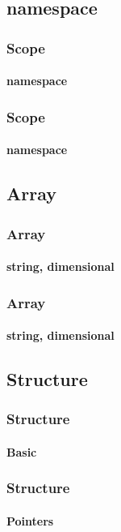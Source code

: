 \documentclass[hyperref={pdfpagelabels=true}]{beamer}
\begin{document}
\subsection{namespace}
\begin{frame}[shrink]
\frametitle{Scope}
\framesubtitle{namespace}
\begin{tcolorbox}[title= ,width=15.5 cm]

\end{tcolorbox}
\end{frame}

\begin{frame}
\frametitle{Scope}
\framesubtitle{namespace}
\begin{tcolorbox}[title= ,width=15.5 cm]

\end{tcolorbox}
\end{frame}

\subsection{Array}


\begin{frame}[shrink]
\frametitle{Array}
\framesubtitle{string, dimensional}
\begin{tcolorbox}[title= ,width=15.5 cm]

\end{tcolorbox}
\end{frame}

\begin{frame}
\frametitle{Array}
\framesubtitle{string, dimensional}
\begin{tcolorbox}[title= ,width=15.5 cm]

\end{tcolorbox}
\end{frame}

\subsection{Structure}

\begin{frame}[shrink]
\frametitle{Structure}
\framesubtitle{Basic}
\begin{tcolorbox}[title= ,width=15.5 cm]

\end{tcolorbox}
\end{frame}

\begin{frame}[shrink]
\frametitle{Structure}
\framesubtitle{Pointers}
\begin{tcolorbox}[title= ,width=15.5 cm]

\end{tcolorbox}
\end{frame}
\end{document}
